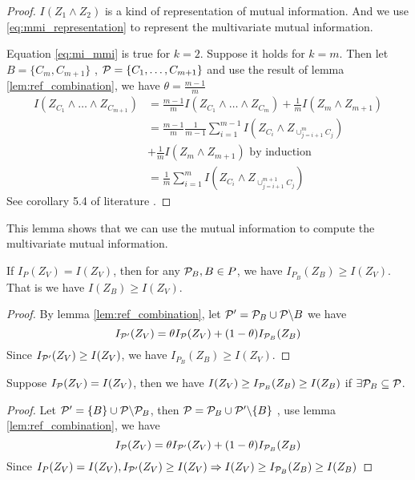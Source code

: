\begin{proof}
\ifshowNonSelf
$I(Z_1 \wedge Z_2)$ is a kind of representation of mutual information.
And we use \eqref{eq:mmi_representation} to represent the multivariate mutual information.

Equation \eqref{eq:mi_mmi} is true for $k=2$. Suppose it holds for $k=m$. Then
let $B=\{C_m, C_{m+1}\}$ , $\P=\{C_1, \dots, C_{m+1}\}$
and use the result of lemma \ref{lem:ref_combination}, 
we have $\theta = \frac{m-1}{m}$
\begin{align*}
I(Z_{C_1} \wedge \dots \wedge Z_{C_{m+1}}) & = 
 \frac{m-1}{m} I(Z_{C_1} \wedge \dots \wedge Z_{C_m})
+ \frac{1}{m}  I(Z_{m} \wedge Z_{m+1}) \\
& = \frac{m-1}{m} \frac{1}{m-1}\sum_{i=1}^{m-1} I(Z_{C_i} \wedge Z_{\cup_{j=i+1}^m C_j})\\
& + \frac{1}{m}  I(Z_{m} \wedge Z_{m+1})\textrm{ by induction} \\
& = \frac{1}{m} \sum_{i=1}^{m} I(Z_{C_i} \wedge Z_{\cup_{j=i+1}^{m+1} C_j})
\end{align*}
\else
See corollary 5.4 of literature \cite{ska}.
\fi
\end{proof}
\begin{remark}
This lemma shows that we can use the mutual information to compute the multivariate mutual information.
\end{remark}
\begin{lemma}\label{lem:elementLarge}
If $I_{P}(Z_V) = I(Z_V)$, then for any $\P_B, B\in P$, we have $I_{P_B}(Z_B) \geq I(Z_V)$. 
That is we have $I(Z_B) \geq I(Z_V)$.
\end{lemma}
\begin{proof}
By lemma \ref{lem:ref_combination}, let $\P' = \P_B \cup \P\backslash B$ we have 
\begin{equation}
I_{\P'}(Z_V) = \theta I_{\P}(Z_V) + (1-\theta) I_{\P_B}(Z_B)
\end{equation}
Since $I_{\P'}(Z_V)\geq I(Z_V)$, we have $I_{P_B}(Z_B) \geq I(Z_V)$.
\end{proof}
\begin{lemma}\label{lem:smallZB}
Suppose $I_{\P}(Z_V) = I(Z_V)$, then we have $I(Z_V) \geq I_{\P_B}(Z_B) \geq I(Z_B)$ if $\exists \P_B \subseteq \P$.
\end{lemma}
\begin{proof}
Let $\P' = \{B\} \cup \P\backslash \P_B$, then $\P = \P_B \cup \P'\backslash\{B\}$ , use lemma \ref{lem:ref_combination}, we have
\begin{equation}
I_{\P}(Z_V) = \theta I_{\P'}(Z_V) + (1-\theta) I_{\P_B}(Z_B)
\end{equation}
Since  $I_{P}(Z_V) = I(Z_V), I_{\P'}(Z_V)\geq I(Z_V) \Rightarrow I(Z_V) \geq I_{\P_B}(Z_B) \geq I(Z_B)$ 
\end{proof}
